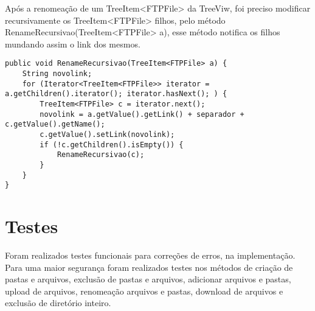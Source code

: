 \documentclass[12pt]{article}
\begin{document}
	Após a renomeação de um TreeItem<FTPFile> da TreeViw, foi preciso modificar recursivamente os TreeItem<FTPFile> filhos, pelo método RenameRecursivao(TreeItem<FTPFile> a), esse método notifica os filhos mundando assim o link dos mesmos.
\begin{lstlisting}
public void RenameRecursivao(TreeItem<FTPFile> a) {
	String novolink;
	for (Iterator<TreeItem<FTPFile>> iterator = a.getChildren().iterator(); iterator.hasNext(); ) {
		TreeItem<FTPFile> c = iterator.next();
		novolink = a.getValue().getLink() + separador + c.getValue().getName();
		c.getValue().setLink(novolink);
		if (!c.getChildren().isEmpty()) {
			RenameRecursivao(c);
		}
	}
}
\end{lstlisting}

\section{Testes}
Foram realizados testes funcionais para correções de erros, na implementação. Para uma maior segurança foram realizados testes nos métodos de criação de pastas e arquivos, exclusão de pastas e arquivos, adicionar arquivos e pastas, upload de arquivos, renomeação arquivos e pastas, download de arquivos e exclusão de diretório inteiro.

 
\end{document}
